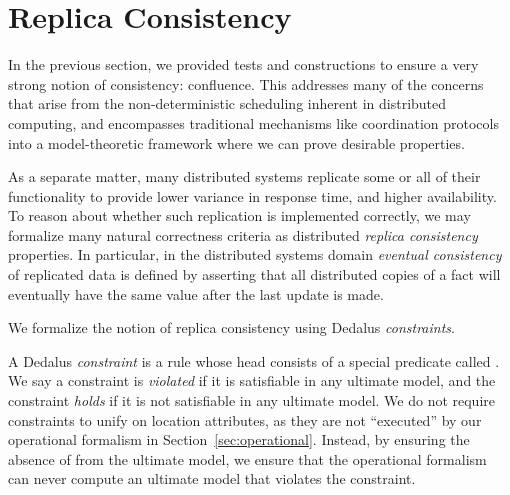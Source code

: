 \section{Replica Consistency}
\label{sec:consistency}

In the previous section, we provided tests and constructions to ensure a very strong notion of consistency: confluence.  This addresses many of the concerns that arise from the non-deterministic scheduling inherent in distributed computing, and encompasses traditional mechanisms like coordination protocols into a model-theoretic framework where we can prove desirable properties.

As a separate matter, many distributed systems replicate some or all of their functionality to provide lower variance in response time, and higher availability.  
To reason about whether such replication is implemented correctly, we may formalize many
natural correctness criteria as distributed {\em replica consistency} properties.
In particular, in the distributed systems domain {\em eventual consistency} of replicated data is defined by asserting that all distributed copies of a fact will eventually have the same value after the last update is made. 

We formalize the notion of replica consistency using Dedalus {\em constraints}.  

\begin{definition}
A Dedalus {\em constraint} is a rule whose head consists of a special predicate called .  We say a constraint is {\em violated} if it is satisfiable in any ultimate model, and the constraint {\em holds} if it is not satisfiable in any ultimate model.  We do not require constraints to unify on location attributes, as they are not ``executed'' by our operational formalism in Section~\ref{sec:operational}.  Instead, by ensuring the absence of  from the ultimate model, we ensure that the operational formalism can never compute an ultimate model that violates the constraint.
\end{definition}

